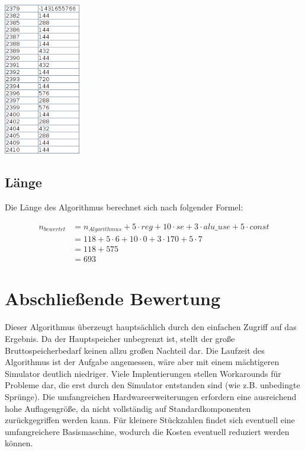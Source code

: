 \begin{multicols}{3}
    \includegraphics[width=0.25\textwidth]{dokumentation/res/bench3_result.png}
\end{multicols}

\subsection{Länge}
\label{subsection:Dokumentation-BenchmarkBewertung-Berechnung-Laenge}

Die Länge des Algorithmus berechnet sich nach folgender Formel:

\begin{align*}
    n_{bewertet} &= n_{Algorithmus} + 5 \cdot reg + 10 \cdot se + 3 \cdot alu\_use + 5 \cdot const \\
                 &= 118 + 5 \cdot 6 + 10 \cdot 0 + 3 \cdot 170 + 5 \cdot 7 \\
                 &= 118 + 575 \\
                 &= 693
\end{align*}

\section{Abschließende Bewertung}
\label{section:Dokumentation-BenchmarkBewertung-Bewertung}

Dieser Algorithmus überzeugt hauptsächlich durch den einfachen Zugriff auf das Ergebnis. Da der Hauptspeicher unbegrenzt ist, stellt der große Bruttospeicherbedarf keinen allzu großen Nachteil dar. Die Laufzeit des Algorithmus ist der Aufgabe angemessen, wäre aber mit einem mächtigeren Simulator deutlich niedriger. Viele Implentierungen stellen Workarounds für Probleme dar, die erst durch den Simulator entstanden sind (wie z.B. unbedingte Sprünge). Die umfangreichen Hardwareerweiterungen erfordern eine ausreichend hohe Auflagengröße, da nicht vollständig auf Standardkomponenten zurückgegriffen werden kann. Für kleinere Stückzahlen findet sich eventuell eine umfangreichere Basismaschine, wodurch die Kosten eventuell reduziert werden können.

